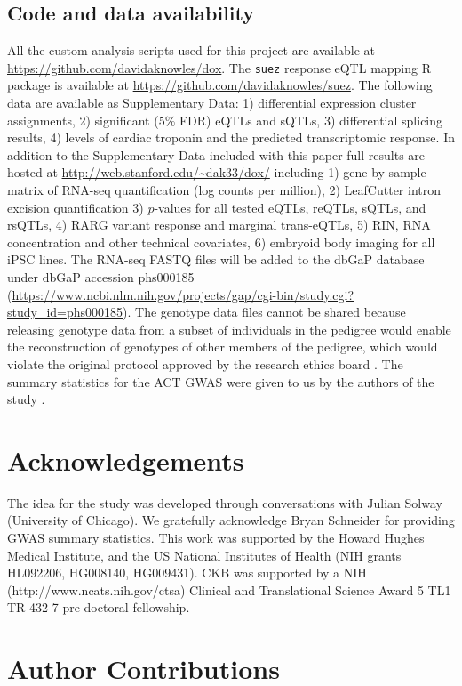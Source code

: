 \documentclass[9pt,lineno]{elife}
\begin{document}
\subsection*{Code and data availability}

All the custom analysis scripts used for this project are available at \url{https://github.com/davidaknowles/dox}. 
The \texttt{suez} response eQTL mapping R package is available at \url{https://github.com/davidaknowles/suez}. 
The following data are available as Supplementary Data: 1) differential expression cluster assignments, 2) significant (5\% FDR) eQTLs and sQTLs, 3) differential splicing results, 4) levels of cardiac troponin and the predicted transcriptomic response. 
In addition to the Supplementary Data included with this paper full results are hosted at \url{http://web.stanford.edu/~dak33/dox/} including 1) gene-by-sample matrix of RNA-seq quantification (log counts per million), 2) LeafCutter intron excision quantification 3) $p$-values for all tested eQTLs, reQTLs, sQTLs, and rsQTLs, 4) RARG variant response and marginal trans-eQTLs, 5) RIN, RNA concentration and other technical covariates, 6) embryoid body imaging for all iPSC lines. 
The RNA-seq FASTQ files will be added to the dbGaP database \citep{Tryka2014} under dbGaP accession phs000185
(\url{https://www.ncbi.nlm.nih.gov/projects/gap/cgi-bin/study.cgi?study_id=phs000185}).
The genotype data files cannot be shared because releasing genotype data
from a subset of individuals in the pedigree would enable the reconstruction of
genotypes of other members of the pedigree, which would violate the original
protocol approved by the research ethics board \citep{Livne2015}. 
The summary statistics for the ACT GWAS were given to us by the authors of the study
\citep{Schneider2016}.

\section*{Acknowledgements}

The idea for the study was developed through conversations with Julian Solway (University of Chicago). We gratefully acknowledge Bryan Schneider for providing GWAS summary statistics. This work was supported by the Howard Hughes Medical Institute, and the US National Institutes of Health (NIH grants HL092206, HG008140, HG009431). 
CKB was supported by a NIH (http://www.ncats.nih.gov/ctsa) Clinical and Translational Science Award 5 TL1 TR 432-7 pre-doctoral fellowship.

\section*{Author Contributions}
\end{document}
